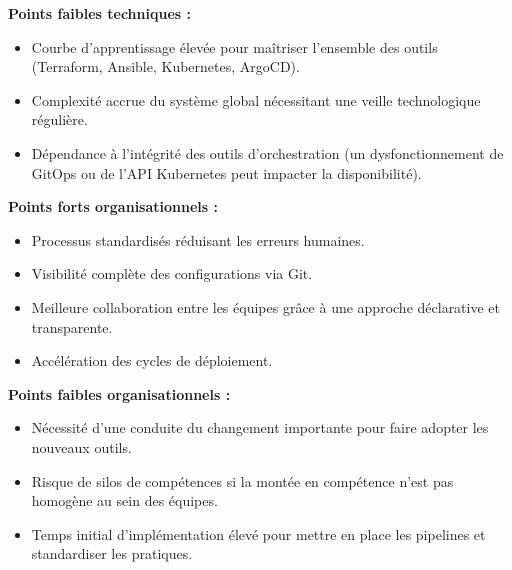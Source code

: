 \textbf{Points faibles techniques :}
\begin{itemize}
	\item Courbe d’apprentissage élevée pour maîtriser l’ensemble des outils (Terraform, Ansible, Kubernetes, ArgoCD).
	\item Complexité accrue du système global nécessitant une veille technologique régulière.
	\item Dépendance à l’intégrité des outils d’orchestration (un dysfonctionnement de GitOps ou de l’API Kubernetes peut impacter la disponibilité).
\end{itemize}

\textbf{Points forts organisationnels :}
\begin{itemize}
	\item Processus standardisés réduisant les erreurs humaines.
	\item Visibilité complète des configurations via Git.
	\item Meilleure collaboration entre les équipes grâce à une approche déclarative et transparente.
	\item Accélération des cycles de déploiement.
\end{itemize}

\textbf{Points faibles organisationnels :}
\begin{itemize}
	\item Nécessité d’une conduite du changement importante pour faire adopter les nouveaux outils.
	\item Risque de silos de compétences si la montée en compétence n’est pas homogène au sein des équipes.
	\item Temps initial d’implémentation élevé pour mettre en place les pipelines et standardiser les pratiques.
\end{itemize}
